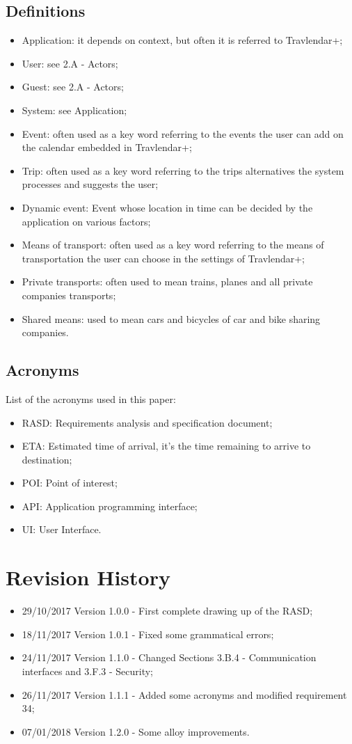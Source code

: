 \subsection{Definitions}
\begin{itemize}
\item Application: it depends on context, but often it is referred to Travlendar+;
\item User: see 2.A - Actors;
\item Guest: see 2.A - Actors;
\item System: see Application;
\item Event: often used as a key word referring to the events the user can add on the calendar embedded in Travlendar+;
\item Trip: often used as a key word referring to the trips alternatives the system processes and suggests the user;
\item Dynamic event: Event whose location in time can be decided by the application on various factors;
\item Means of transport: often used as a key word referring to the means of transportation the user can choose in the settings of Travlendar+;
\item Private transports: often used to mean trains, planes and all private companies transports;
\item Shared means: used to mean cars and bicycles of car and bike sharing companies.
\end{itemize}
%
\subsection{Acronyms}
List of the acronyms used in this paper:
\begin{itemize}
\item RASD: Requirements analysis and specification document;
\item ETA: Estimated time of arrival, it's the time remaining to arrive to destination;
\item POI: Point of interest;
\item API: Application programming interface;
\item UI: User Interface.
\end{itemize}
%
%
\section{Revision History}
\begin{itemize}
\item 29/10/2017 Version 1.0.0 - First complete drawing up of the RASD;
\item 18/11/2017 Version 1.0.1 - Fixed some grammatical errors;
\item 24/11/2017 Version 1.1.0 - Changed Sections 3.B.4 - Communication interfaces and 3.F.3 - Security;
\item 26/11/2017 Version 1.1.1 - Added some acronyms and modified requirement 34;
\item 07/01/2018 Version 1.2.0 - Some alloy improvements.
\end{itemize}
%
%
